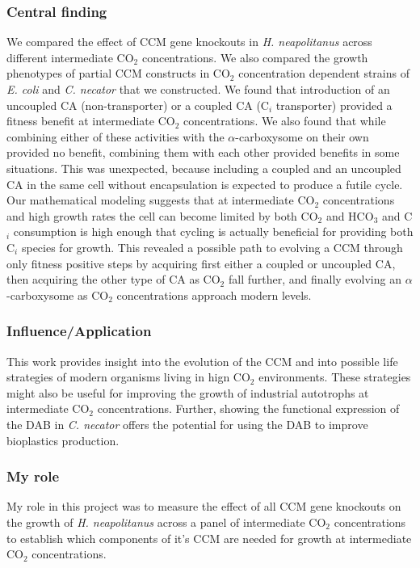 \documentclass{article}
\begin{document}
\subsubsection{Central finding}
We compared the effect of CCM gene knockouts in \textit{H. neapolitanus} across different intermediate CO$_2$ concentrations.
We also compared the growth phenotypes of partial CCM constructs in CO$_2$ concentration dependent strains of \textit{E. coli} and \textit{C. necator} that we constructed.
We found that introduction of an uncoupled CA (non-transporter) or a coupled CA (C$_i$ transporter) provided a fitness benefit at intermediate CO$_2$ concentrations.
We also found that while combining either of these activities with the $\alpha$-carboxysome on their own provided no benefit, combining them with each other provided benefits in some situations. 
This was unexpected, because including a coupled and an uncoupled CA in the same cell without encapsulation is expected to produce a futile cycle.
Our mathematical modeling suggests that at intermediate CO$_2$ concentrations and high growth rates the cell can become limited by both CO$_2$ and HCO$_3$ and C$_i$ consumption is high enough that cycling is actually beneficial for providing both C$_i$ species for growth.
This revealed a possible path to evolving a CCM through only fitness positive steps by acquiring first either a coupled or uncoupled CA, then acquiring the other type of CA as CO$_2$ fall further, and finally evolving an $\alpha$-carboxysome as CO$_2$ concentrations approach modern levels.
%
\subsubsection{Influence/Application}
This work provides insight into the evolution of the CCM and into possible life strategies of modern organisms living in hign CO$_2$ environments.
These strategies might also be useful for improving the growth of industrial autotrophs at intermediate CO$_2$ concentrations.
Further, showing the functional expression of the DAB in \textit{C. necator} offers the potential for using the DAB to improve bioplastics production.
%
\subsubsection{My role}
My role in this project was to measure the effect of all CCM gene knockouts on the growth of \textit{H. neapolitanus} across a panel of intermediate CO$_2$ concentrations to establish which components of it's CCM are needed for growth at intermediate CO$_2$ concentrations.
%
\nocite{Flamholz2022-yo}
\printbibliography[heading=none]
\end{document}
